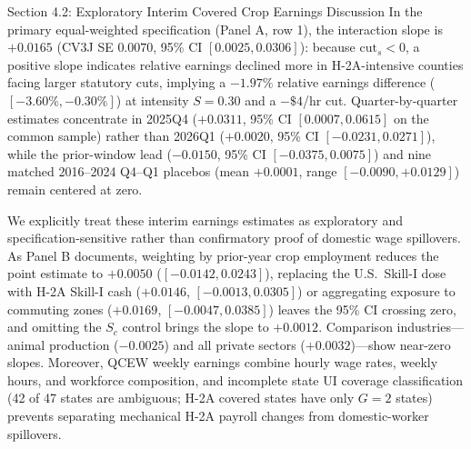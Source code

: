 

\begin{llmdraft}{Section 4.2: Exploratory Interim Covered Crop Earnings Discussion}
In the primary equal-weighted specification (Panel A, row 1), the interaction
slope is $+0.0165$ (CV3J SE $0.0070$, 95\% CI $[0.0025, 0.0306]$): because
$\text{cut}_s < 0$, a positive slope indicates relative earnings declined more
in H-2A-intensive counties facing larger statutory cuts, implying a $-1.97\%$
relative earnings difference ($[-3.60\%, -0.30\%]$) at intensity $S=0.30$ and a
$-\$4$/hr cut. Quarter-by-quarter estimates concentrate in 2025Q4 ($+0.0311$,
95\% CI $[0.0007, 0.0615]$ on the common sample) rather than 2026Q1
($+0.0020$, 95\% CI $[-0.0231, 0.0271]$), while the prior-window lead
($-0.0150$, 95\% CI $[-0.0375, 0.0075]$) and nine matched 2016--2024 Q4--Q1
placebos (mean $+0.0001$, range $[-0.0090, +0.0129]$) remain centered at zero.

We explicitly treat these interim earnings estimates as exploratory and
specification-sensitive rather than confirmatory proof of domestic wage
spillovers. As Panel B documents, weighting by prior-year crop employment
reduces the point estimate to $+0.0050$ ($[-0.0142, 0.0243]$), replacing the
U.S.\ Skill-I dose with H-2A Skill-I cash ($+0.0146$, $[-0.0013, 0.0305]$) or
aggregating exposure to commuting zones ($+0.0169$, $[-0.0047, 0.0385]$) leaves
the 95\% CI crossing zero, and omitting the $S_c$ control brings the slope to
$+0.0012$. Comparison industries---animal production ($-0.0025$) and all
private sectors ($+0.0032$)---show near-zero slopes. Moreover, QCEW weekly
earnings combine hourly wage rates, weekly hours, and workforce composition,
and incomplete state UI coverage classification (42 of 47 states are
ambiguous; H-2A covered states have only $G=2$ states) prevents separating
mechanical H-2A payroll changes from domestic-worker spillovers.
\end{llmdraft}


